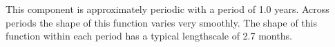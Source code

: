 This component is approximately periodic with a period of 1.0 years.
Across periods the shape of this function varies very smoothly.
The shape of this function within each period has a typical lengthscale of 2.7 months.